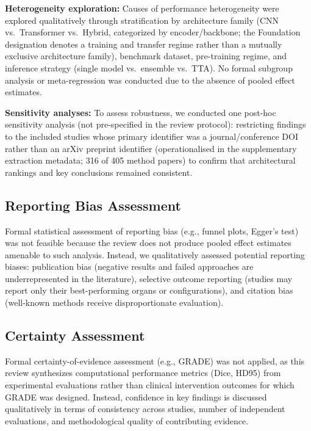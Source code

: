 \textbf{Heterogeneity exploration:} Causes of performance heterogeneity were explored qualitatively through stratification by architecture family (CNN vs.\ Transformer vs.\ Hybrid, categorized by encoder/backbone; the Foundation designation denotes a training and transfer regime rather than a mutually exclusive architecture family), benchmark dataset, pre-training regime, and inference strategy (single model vs.\ ensemble vs.\ TTA). No formal subgroup analysis or meta-regression was conducted due to the absence of pooled effect estimates.

\textbf{Sensitivity analyses:} To assess robustness, we conducted one post-hoc sensitivity analysis (not pre-specified in the review protocol): restricting findings to the included studies whose primary identifier was a journal/conference DOI rather than an arXiv preprint identifier (operationalised in the supplementary extraction metadata; 316 of 405 method papers) to confirm that architectural rankings and key conclusions remained consistent.

\subsection{Reporting Bias Assessment}

Formal statistical assessment of reporting bias (e.g., funnel plots, Egger's test) was not feasible because the review does not produce pooled effect estimates amenable to such analysis. Instead, we qualitatively assessed potential reporting biases: publication bias (negative results and failed approaches are underrepresented in the literature), selective outcome reporting (studies may report only their best-performing organs or configurations), and citation bias (well-known methods receive disproportionate evaluation).

\subsection{Certainty Assessment}

Formal certainty-of-evidence assessment (e.g., GRADE) was not applied, as this review synthesizes computational performance metrics (Dice, HD95) from experimental evaluations rather than clinical intervention outcomes for which GRADE was designed. Instead, confidence in key findings is discussed qualitatively in terms of consistency across studies, number of independent evaluations, and methodological quality of contributing evidence.


